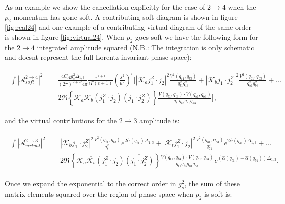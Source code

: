 		As an example we show the cancellation explicitly for the case of $2\rightarrow4$ when the $p_2$ momentum has gone soft.  A contributing soft diagram is shown in figure \ref{fig:real24} and one example of a contributing virtual diagram of the same order is shown in figure \ref{fig:virtual24}.  When $p_2$ goes soft we have the following form for the $2\rightarrow4$ integrated amplitude squared ({N.B.}: The integration is only schematic and doesnt represent the full Lorentz invariant phase space):

		\begin{align}
		\begin{split}
		\int|\mathcal{A}^{2\rightarrow4}_{soft}|^2 = &\frac{4C_Ag_s^2\Delta_{1,3}}{(2\pi)^{2+2\epsilon}4\pi}\frac{\pi^{\epsilon+1}}{\epsilon\Gamma(\epsilon+1)}
		\left(\frac{\lambda^2}{\mu^2}\right)^\epsilon\Bigg[|\mathcal{K}_aj_1^Z\cdot j_2|^2 \frac{V^2(q_{t1}, q_{t3})}{q^2_{t1}q^2_{t3}} + |\mathcal{K}_bj_1\cdot j_2^Z|^2 \frac{V^2(q_{b1}, q_{b3})}{q^2_{b1}q^2_{b3}} + \ldots \\
		& 2\Re\left\{\mathcal{K}_a\overline{\mathcal{K}_b}  (j_1^Z\cdot j_2)\overline{(j_1\cdot j_2^Z)}\right\} \frac{V(q_{t1}, q_{t3})\cdot V(q_{b1}, q_{b3})}{q_{t1}q_{t3}q_{b1}q_{b3}}\Bigg],
		\end{split}
		\end{align}

		and the virtual contributions for the $2\rightarrow3$ amplitude is:

		\begin{align}
		\begin{split}
		\int|\mathcal{A}^{2\rightarrow3}_{virtual}|^2 = &|\mathcal{K}_bj_1\cdot j_2^Z|^2 \frac{V^2(q_{t1}, q_{t3})}{q_{t1}^2}e^{2\hat{\alpha}(q_{t1})\Delta_{1,3}} + |\mathcal{K}_tj_1^Z\cdot j_2|^2 \frac{V^2(q_{b1}, q_{b3})}{q_{b1}^2}e^{2\hat{\alpha}(q_{b1})\Delta_{1,3}} + \ldots \\
		& 2\Re\left\{\mathcal{K}_a\overline{\mathcal{K}_b}  (j_1^Z\cdot j_2)\overline{(j_1\cdot j_2^Z)}\right\} \frac{V(q_{t1}, q_{t3})\cdot V(q_{b1}, q_{b3})}{q_{t1}q_{t3}q_{b1}q_{b3}}e^{(\hat{\alpha}(q_{t1}) + \hat{\alpha}(q_{b1}))\Delta_{1,3}}.
		\end{split}
		\end{align}

		Once we expand the exponential to the correct order in $g_s^2$, the sum of these matrix elements squared over the region of phase space when $p_2$ is soft is:

